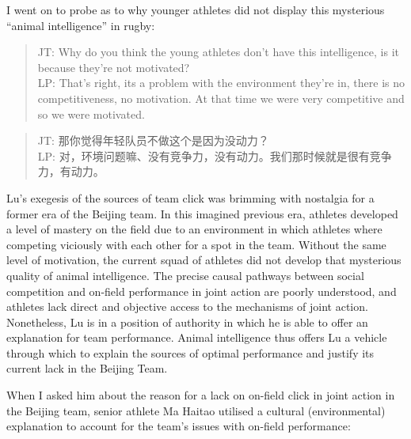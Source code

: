 \begin{CJK}{UTF8}{gbsn}
I went on to probe as to why younger athletes did not display this mysterious ``animal intelligence'' in rugby:

\begin{quote}
      JT: Why do you think the young athletes don't have this intelligence, is it because they're not motivated? \\
      LP: That's right, its a problem with the environment they're in, there is no competitiveness, no motivation.  At that time we were very competitive and so we were motivated.
\end{quote}

\begin{quote}
      JT: 那你觉得年轻队员不做这个是因为没动力？\\
      LP: 对，环境问题嘛、没有竞争力，没有动力。我们那时候就是很有竞争力，有动力。
\end{quote}

Lu's exegesis of the sources of team click was brimming with nostalgia for a former era of the Beijing team.  In this imagined previous era,  athletes developed a level of mastery on the field due to an environment in which athletes where competing viciously with each other for a spot in the team.  Without the same level of motivation, the current squad of athletes did not develop that mysterious quality of animal intelligence.  The precise causal pathways between social competition and on-field performance in joint action are poorly understood, and athletes lack direct and objective access to the mechanisms of joint action.  Nonetheless, Lu is in a position of authority in which he is able to offer an explanation for team performance.  Animal intelligence thus offers Lu a vehicle through which to explain the sources of optimal performance and justify its current lack in the Beijing Team.

When I asked him about the reason for a lack on on-field click in joint action in the Beijing team, senior athlete Ma Haitao utilised a cultural (environmental) explanation to account for the team's issues with on-field performance:


\end{CJK}
